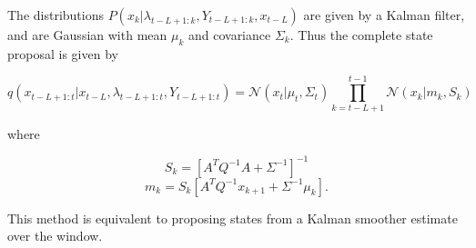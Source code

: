 The distributions $P(x_k|\lambda_{t-L+1:k}, Y_{t-L+1:k}, x_{t-L})$ are given by a Kalman filter, and are Gaussian with mean $\mu_k$ and covariance $\Sigma_k$. Thus the complete state proposal is given by

\begin{equation}
q(x_{t-L+1:t}|x_{t-L}, \lambda_{t-L+1:t}, Y_{t-L+1:t}) = \mathcal{N}(x_t|\mu_t, \Sigma_t) \prod_{k=t-L+1}^{t-1} \mathcal{N}(x_k|m_k, S_k)
\end{equation}

where

\begin{equation}S_k = [ A^T Q^{-1} A + \Sigma^{-1} ]^{-1}\end{equation}
\begin{equation}m_k = S_k [ A^T Q^{-1} x_{k+1} + \Sigma^{-1} \mu_k ] .\end{equation}

This method is equivalent to proposing states from a Kalman smoother estimate over the window.
